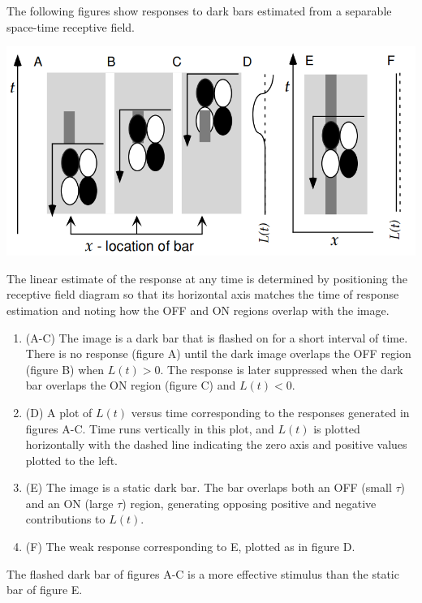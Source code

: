 \begin{exm}
  \label{exm:explain1}
  The following figures show responses to dark bars estimated from a separable space-time receptive field.
  \begin{center}
    \includegraphics[scale=0.27]{./png/responseSelectivityExplain1}
  \end{center}
  The linear estimate of the response at any time is determined by positioning the receptive field diagram so that its horizontal axis matches the time of response estimation and noting how the OFF and ON regions overlap with the image.
  \begin{enumerate}[]
  \item (A-C) The image is a dark bar that is flashed on for a short interval of time. There is no response (figure A) until the dark image overlaps the OFF region (figure B) when $L(t)>0$. The response is later suppressed when the dark bar overlaps the ON region (figure C) and $L(t) < 0$.
  \item  (D) A plot of $L(t)$ versus time corresponding to the responses generated in figures A-C. Time runs vertically in this plot, and $L(t)$ is plotted horizontally with the dashed line indicating the zero axis and positive values plotted to the left.
  \item (E) The image is a static dark bar. The bar overlaps both an OFF (small $\tau$) and an ON (large $\tau$) region, generating opposing positive and negative contributions to $L(t)$.
  \item (F) The weak response corresponding to E, plotted as in figure D.
  \end{enumerate}
  The flashed dark bar of figures A-C is a more effective stimulus than the static bar of figure E.
\end{exm}

